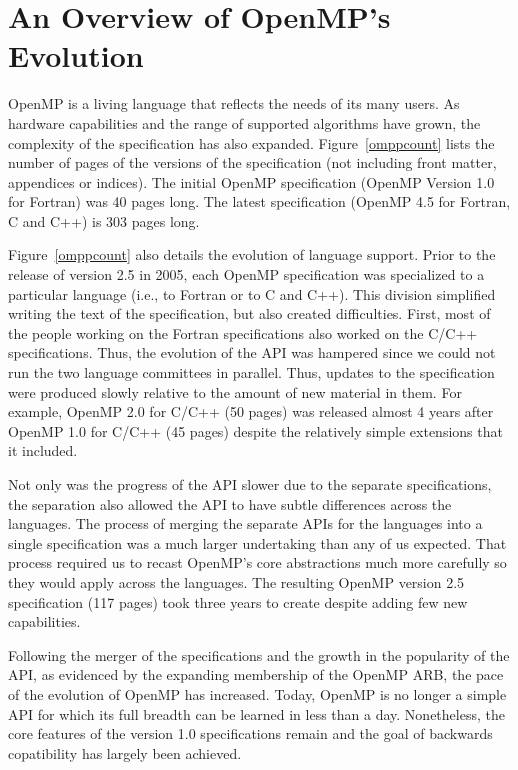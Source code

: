 \section{An Overview of OpenMP's Evolution}
\label{sec:evolve}

OpenMP is a living language that reflects the needs of its many users. 
As hardware capabilities and the range of supported algorithms have 
grown, the complexity of the specification has also expanded. 
Figure~\ref{omppcount} lists the number of pages of the versions of 
the specification (not including front matter, appendices or indices).   
The initial OpenMP specification (OpenMP Version 1.0 for Fortran) was 
40 pages long. The latest specification (OpenMP 4.5 for Fortran, 
C and C++) is 303 pages long.

Figure~\ref{omppcount} also details the evolution of language support.
Prior to the release of version 2.5 in 2005, each OpenMP specification 
was specialized to a particular language (i.e., to Fortran or to C and 
C++). This division simplified writing the text of the specification, 
but also created difficulties. First, most of the people working on the 
Fortran specifications also worked on the C/C++ specifications. Thus, the 
evolution of the API was hampered since we could not run the two 
language committees in parallel. Thus, updates to the specification 
were produced slowly relative to the amount of new material in them.
For example, OpenMP 2.0 for C/C++ (50 pages) was released almost 4 years 
after OpenMP 1.0 for C/C++ (45 pages) despite the relatively simple 
extensions that it included. 

Not only was the progress of the API slower due to the separate 
specifications, the separation also allowed the API to have subtle 
differences across the languages. The process of merging the separate
APIs for the languages into a single  specification was a much larger 
undertaking than any of us expected. That process required us to recast 
OpenMP's core abstractions much more carefully so they would apply across 
the languages. The resulting OpenMP version 2.5 specification (117 pages)
took three years to create despite adding few new capabilities.

Following the merger of the specifications and the growth in the popularity
of the API, as evidenced by the expanding membership of the OpenMP ARB,
the pace of the evolution of OpenMP has increased. Today, OpenMP is no 
longer a simple API for which its full breadth can be learned in less 
than a day. Nonetheless, the core features of the version 1.0 specifications
remain and the goal of backwards copatibility has largely been achieved.

